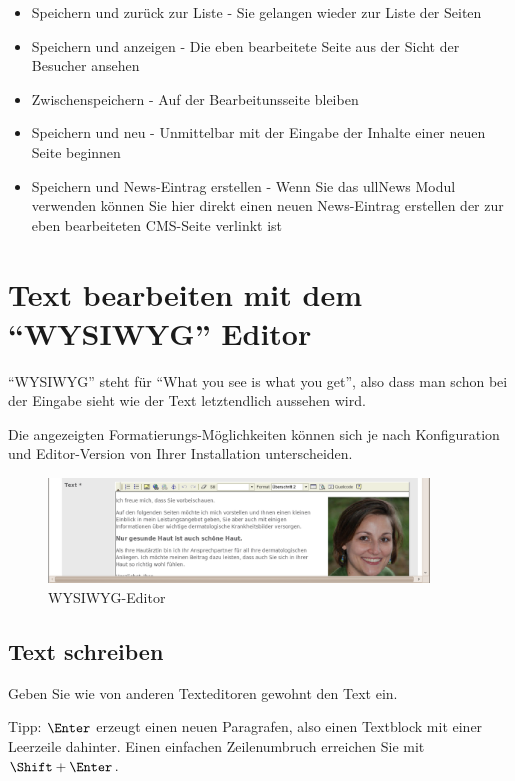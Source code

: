 \documentclass[article, a4paper, oneside, 11pt]{memoir}
\begin{document}
\begin{itemize}
\item Speichern und zurück zur Liste - Sie gelangen wieder zur Liste der Seiten
\item Speichern und anzeigen - Die eben bearbeitete Seite aus der Sicht der Besucher ansehen
\item Zwischenspeichern - Auf der Bearbeitunsseite bleiben
\item Speichern und neu - Unmittelbar mit der Eingabe der Inhalte einer neuen Seite beginnen
\item Speichern und News-Eintrag erstellen - Wenn Sie das ullNews Modul verwenden können Sie hier direkt einen neuen News-Eintrag erstellen der zur eben bearbeiteten CMS-Seite verlinkt ist
\end{itemize}



\section{Text bearbeiten mit dem "`WYSIWYG"' Editor}
\label{sec:editor}

"`WYSIWYG"' steht für "`What you see is what you get"',  also dass man schon bei der Eingabe sieht wie der Text letztendlich aussehen wird.

Die angezeigten Formatierungs-Möglichkeiten können sich je nach Konfiguration und Editor-Version von Ihrer Installation unterscheiden.

\begin{figure}[htp]
\centering
\includegraphics[width=0.9\textwidth]{editor}
\caption{WYSIWYG-Editor}
\label{fig:editor}
\end{figure}

\subsection{Text schreiben}

Geben Sie wie von anderen Texteditoren gewohnt den Text ein.

Tipp: $\Enter$ erzeugt einen neuen Paragrafen, also einen Textblock mit einer Leerzeile dahinter. Einen einfachen Zeilenumbruch erreichen Sie mit $\Shift + \Enter$.
\end{document}
